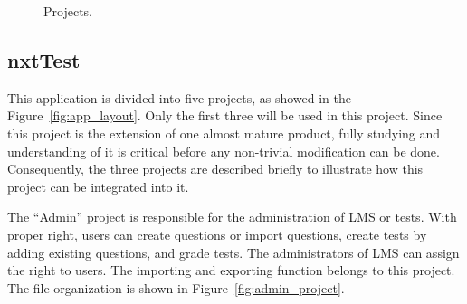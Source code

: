 \begin{figure}[h]
\begin{center}
	\end{center}
	\caption{Projects.}
\end{figure}
\subsection{nxtTest}
This application is divided into five projects, as showed in the Figure~\ref{fig:app_layout}. Only the first three will be used in this project. 
Since this project is the extension of one almost mature product, fully studying and understanding of it is critical before any non-trivial 
modification can be done. Consequently, the three projects are described briefly to illustrate how this project can be integrated into it.

The ``Admin'' project is responsible for the administration of LMS or tests. With proper right, users can create questions or import questions, create
tests by adding existing questions, and grade tests. The administrators of LMS can assign the right to users. The importing and exporting function 
belongs to this project. The file organization is shown in Figure~\ref{fig:admin_project}.

